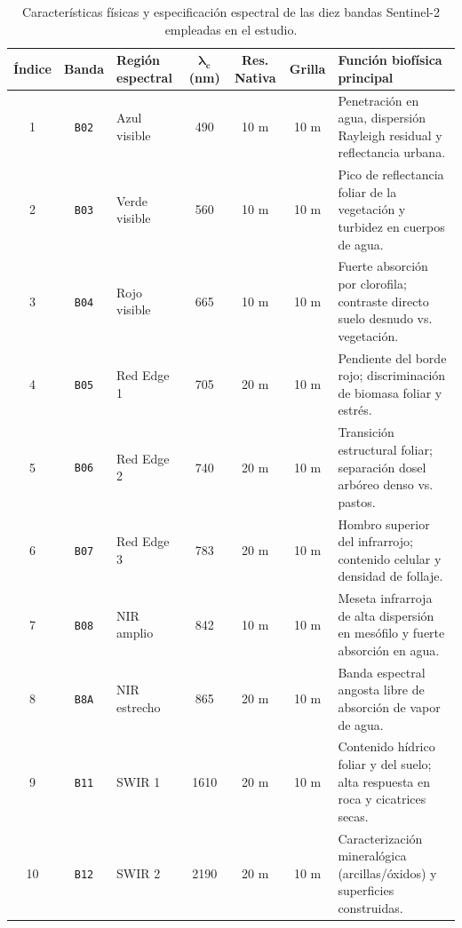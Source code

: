\documentclass[11pt,a4paper]{article}
\begin{document}
\begin{table}[H]
\centering
\small
\begin{tabularx}{\textwidth}{c c l c c c X}
\toprule
\textbf{Índice} & \textbf{Banda} & \textbf{Región espectral} & $\boldsymbol{\lambda_c}$ \textbf{(nm)} & \textbf{Res. Nativa} & \textbf{Grilla} & \textbf{Función biofísica principal} \\
\midrule
1 & \texttt{B02} & Azul visible & 490 & 10 m & 10 m & Penetración en agua, dispersión Rayleigh residual y reflectancia urbana. \\
2 & \texttt{B03} & Verde visible & 560 & 10 m & 10 m & Pico de reflectancia foliar de la vegetación y turbidez en cuerpos de agua. \\
3 & \texttt{B04} & Rojo visible & 665 & 10 m & 10 m & Fuerte absorción por clorofila; contraste directo suelo desnudo vs. vegetación. \\
4 & \texttt{B05} & Red Edge 1 & 705 & 20 m & 10 m & Pendiente del borde rojo; discriminación de biomasa foliar y estrés. \\
5 & \texttt{B06} & Red Edge 2 & 740 & 20 m & 10 m & Transición estructural foliar; separación dosel arbóreo denso vs. pastos. \\
6 & \texttt{B07} & Red Edge 3 & 783 & 20 m & 10 m & Hombro superior del infrarrojo; contenido celular y densidad de follaje. \\
7 & \texttt{B08} & NIR amplio & 842 & 10 m & 10 m & Meseta infrarroja de alta dispersión en mesófilo y fuerte absorción en agua. \\
8 & \texttt{B8A} & NIR estrecho & 865 & 20 m & 10 m & Banda espectral angosta libre de absorción de vapor de agua. \\
9 & \texttt{B11} & SWIR 1 & 1610 & 20 m & 10 m & Contenido hídrico foliar y del suelo; alta respuesta en roca y cicatrices secas. \\
10 & \texttt{B12} & SWIR 2 & 2190 & 20 m & 10 m & Caracterización mineralógica (arcillas/óxidos) y superficies construidas. \\
\bottomrule
\end{tabularx}
\caption{Características físicas y especificación espectral de las diez bandas Sentinel-2 empleadas en el estudio.}
\label{tab:bandas}
\end{table}
\end{document}
